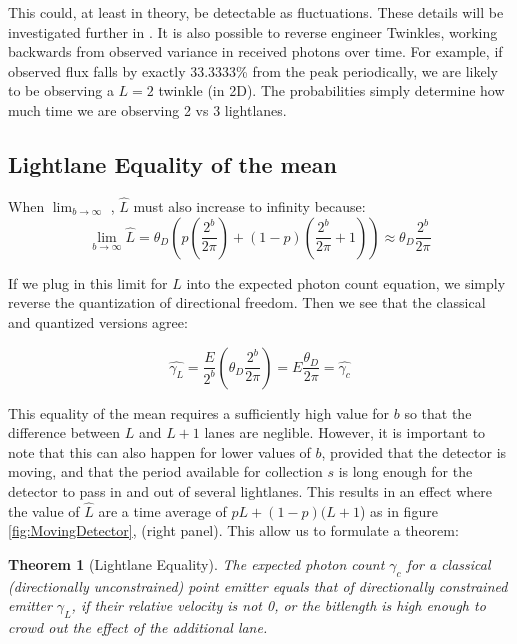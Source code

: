\documentclass[notitlepage]{article}
\newtheorem{theorem}{Theorem}
\begin{document}
This could, at least in theory, be detectable as fluctuations. These details will be investigated further in \cite{RhadamantysA3}. It is also possible to reverse engineer Twinkles, working backwards from observed variance in received photons over time. For example, if observed flux falls by exactly 33.3333\% from the peak periodically, we are likely to be observing a $L=2$ twinkle (in 2D). The probabilities simply determine how much time we are observing 2 vs 3 lightlanes.

\subsection{Lightlane Equality of the mean}
When $\lim_{b \rightarrow \infty}$ , $\hat{L}$ must also increase to infinity because:
\begin{equation}
\lim_{b \rightarrow \infty} \hat{L} = \theta_D \left( p (\frac{2^b}{2 \pi}) + (1-p)(\frac{2^b}{2\pi}+1)\right)
\approx \theta_D \frac{2^b}{2\pi}
\end{equation}

If we plug in this limit for $\hat{L}$ into the expected photon count equation, we simply reverse the quantization of directional freedom. Then we see that the classical and quantized versions agree:

\begin{equation}
\hat{\gamma_L} = \frac{E}{2^b} (\theta_D \frac{2^b}{2\pi})  = E \frac{\theta_D}{2\pi}  = \hat{\gamma_c}
\end{equation}

This equality of the mean requires a sufficiently high value for $b$ so that the difference between $L$ and $L+1$ lanes are neglible. However, it is important to note that this can also happen for lower values of $b$, provided that the detector is moving, and that the period available for collection $s$ is long enough for the detector to pass in and out of several lightlanes. This results in an effect where the value of $\hat{L}$ are a time average of $pL + (1-p)(L+1$) as in figure  \ref{fig:MovingDetector}, (right panel). This allow us to formulate a theorem:

\begin{theorem}[Lightlane Equality]
The expected photon count $\gamma_c$ for a classical (directionally unconstrained) point emitter equals that of directionally constrained emitter $\gamma_{L}$, if their relative velocity is not 0, or the bitlength is high enough to crowd out the effect of the additional lane. 
\end{theorem}
\end{document}
